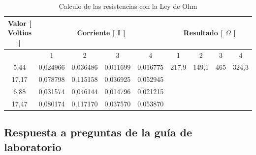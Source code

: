 \documentclass[letterpaper, 12pt]{report}
\begin{document}
\begin{table}[H]
	\begin{center}
		\begin{tabular}{|cc|c|c|c|c|c|c|c|c|}
			\hline
			\multicolumn{2}{c}{Valor [ Voltios ]} &
			\multicolumn{4}{c}{Corriente [ I ]}   &
			\multicolumn{4}{c}{Resultado [ $\Omega$ ]}                                                            \\ \hline

			                                      &          & 1        & 2        & 3        & 4 & 1 & 2 & 3 & 4 \\ \hline

			\multicolumn{2}{c}{5,44}              & 0,024966 & 0,036486 & 0,011699 & 0,016775 &
			217,9                                 &
			149,1                                 &
			465                                   &
			324,3                                                                                                 \\

			\multicolumn{2}{c}{17,17}             & 0,078798 & 0,115158 & 0,036925 & 0,052945 &
			                                      &
			                                      &
			                                      &
			\\

			\multicolumn{2}{c}{6,88}              & 0,031574 & 0,046144 & 0,014796 & 0,021215 &
			                                      &
			                                      &
			                                      &
			\\

			\multicolumn{2}{c}{17,47}             & 0,080174 & 0,117170 & 0,037570 & 0,053870 &
			                                      &
			                                      &
			                                      &
			\\ \hline
		\end{tabular}
		\caption{Calculo de las resistencias con la Ley de Ohm}
		\label{tab:LeyDeOhmResistencias}
	\end{center}
\end{table}

\subsection{Respuesta a preguntas de la guía de laboratorio}

\end{document}
